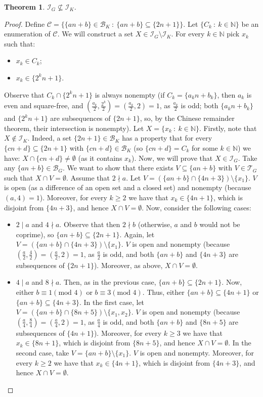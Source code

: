 \documentclass{amsart}
\newtheorem{thm}{Theorem}
\theoremstyle{definition}
\theoremstyle{definition}
\newcommand{\N}{{\mathbb N}}
\newcommand{\I}{\mathcal I}
\newcommand{\T}{\mathcal{T}}
\newcommand{\B}{\mathcal{B}}
\begin{document}
\begin{thm}
$\I_G \not\subseteq \I_K$.
\end{thm}	   
\begin{proof}
Define $\mathcal{C} = \{\{an+b\}\in \B_K\ :\ \{an+b\}\subseteq \{2n+1\}\}$. Let $\{C_k\ :\ k\in\N\}$ be an enumeration of $\mathcal{C}$.
We will construct a set $X \in \I_G \setminus \I_K$. For every $k\in\N$ pick $x_k$ such that:
\begin{itemize}
	\item $x_k\in C_k$;
	\item $x_k\in \{2^k n+1\}$.
\end{itemize}
Observe that $C_k \cap \{2^k n+1\}$ is always nonempty (if $C_k = \{a_k n+b_k\}$, then $a_k$ is even and square-free, and $(\frac{a_k}{2},\frac{2^k}{2})=(\frac{a_k}{2},2)=1$, as $\frac{a_k}{2}$ is odd; both $\{a_k n+b_k\}$ and $\{2^k n+1\}$ are subsequences of $\{2n+1\}$, so, by the Chinese remainder theorem, their intersection is nonempty). Let $X = \{x_k\ :\ k\in\N\}$.
Firstly, note that $X \notin \I_K$. Indeed, a set $\{2n+1\}\in\B_K$ has a property that for every $\{cn+d\}\subseteq \{2n+1\}$ with $\{cn+d\}\in \B_K$ (so $\{cn+d\}=C_k$ for some $k\in\N$) we have: $X\cap \{cn+d\} \neq \emptyset$ (as it contains $x_k$).
Now, we will prove that $X \in \I_G$. Take any $\{an+b\}\in\B_G$. We want to show that there exists $V\subseteq \{an+b\}$ with $V\in \T_G$ such that $X\cap V = \emptyset$. 
Assume that $2\nmid a$. Let $V = (\{an+b\} \cap \{4n+3\})\setminus\{x_1\}$. $V$ is open (as a difference of an open set and a closed set) and nonempty (because $(a,4)=1$). Moreover, for every $k\geq 2$ we have that $x_k\in \{4n+1\}$, which is disjoint from $\{4n+3\}$, and hence $X\cap V = \emptyset$.
Now, consider the following cases:
\begin{itemize}
 \item $2\mid a$ and $4\nmid a$. Observe that then $2 \nmid b$ (otherwise, $a$ and $b$ would not be coprime), so $\{an+b\}\subseteq \{2n+1\}$. Again, let $V = (\{an+b\} \cap \{4n+3\})\setminus\{x_1\}$. $V$ is open and nonempty (because $(\frac{a}{2},\frac{4}{2})=(\frac{a}{2},2)=1$, as $\frac{a}{2}$ is odd, and both $\{an+b\}$ and $\{4n+3\}$ are subsequences of $\{2n+1\}$). Moreover, as above, $X\cap V = \emptyset$.
 \item $4\mid a$ and $8\nmid a$. Then, as in the previous case, $\{an+b\}\subseteq \{2n+1\}$. Now, either $b\equiv 1 (\textrm{mod } 4)$ or $b\equiv 3 (\textrm{mod } 4)$. Thus, either $\{an+b\}\subseteq \{4n+1\}$ or $\{an+b\}\subseteq \{4n+3\}$. In the first case, let $V = (\{an+b\} \cap \{8n+5\})\setminus\{x_1, x_2\}$. $V$ is open and nonempty (because $(\frac{a}{4},\frac{8}{4})=(\frac{a}{4},2)=1$, as $\frac{a}{4}$ is odd, and both $\{an+b\}$ and $\{8n+5\}$ are subsequences of $\{4n+1\}$). Moreover, for every $k\geq 3$ we have that $x_k\in \{8n+1\}$, which is disjoint from $\{8n+5\}$, and hence $X\cap V = \emptyset$. In the second case, take $V = \{an+b\} \setminus\{x_1\}$. $V$ is open and nonempty. Moreover, for every $k\geq 2$ we have that $x_k\in \{4n+1\}$, which is disjoint from $\{4n+3\}$, and hence $X\cap V = \emptyset$.

\end{itemize}
\end{proof}
\end{document}

